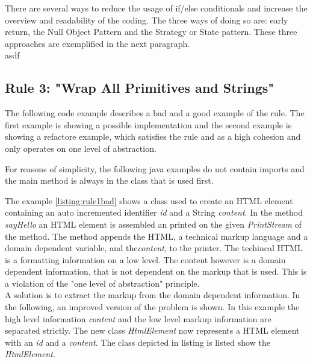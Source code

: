 There are several ways to reduce the usage of if/else conditionals and increase the overview and readability of the coding. The three ways of doing so are: early return, the Null Object Pattern and the Strategy or State pattern. These three approaches are exemplified in the next paragraph. 
\\





















asdf
\subsection{Rule 3: "Wrap All Primitives and Strings"}


The following code example describes a bad and a good example of the rule. The first example is showing a possible implementation and the second example is showing a refactore example, which satisfies the rule and as a high cohesion and only operates on one level of abstraction. 

For reasons of simplicity, the following java examples do not contain imports and the main method is always in the class that is used first. 

%
\label{listing:rule1bad}

The example \ref{listing:rule1bad} shows a class used to create an \acf{HTML} element containing an auto incremented identifier \textit{id} and a String \textit{content}. In the method \textit{sayHello} an \acf{HTML} element is assembled an printed on the given \textit{PrintStream} of the method. The method appends the \acf{HTML}, a technical markup language and a domain dependent variable, and the\textit{content}, to the printer. The techincal \acf{HTML} is a formatting information on a low level. The content however is a domain dependent information, that is not dependent on the markup that is used. This is a violation of the "one level of abstraction" principle.\\

A solution is to extract the markup from the domain dependent information. In the following, an improved version of the problem is shown. In this example the high level information \textit{content} and the low level markup information are separated strictly. The new class \textit{HtmlElement} now represents a \acf{HTML} element with an \textit{id} and a \textit{content}. The class depicted in listing \label{listing:rule1good:element} is listed show the \textit{HtmlElement}. 

